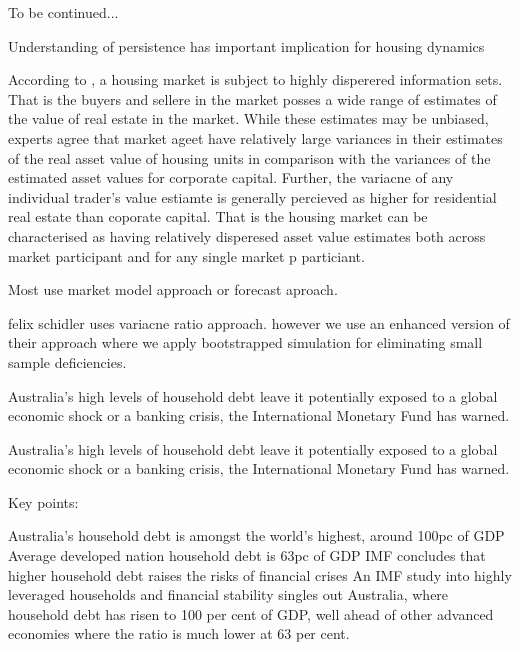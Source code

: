 \documentclass[AEJ,reqno, draftmode]{AEA}
\begin{document}
To be continued...

Understanding of persistence has important implication for housing dynamics


According to \citet{Linneman1986AnMarket}, a housing market is subject to highly disperered information sets. That is the buyers and sellere in the market posses a wide range of estimates of the value of real estate in the market. While these estimates may be unbiased, experts agree that market ageet have relatively large variances in their estimates of the real asset value of housing units in comparison with the variances of the estimated asset values for corporate capital. Further, the variacne of any individual trader's value estiamte is generally percieved as higher for residential real estate than coporate capital. That is the housing market can be characterised as having relatively disperesed asset value estimates both across market participant and for any single market p particiant.


Most use market model approach or forecast aproach. 

felix schidler uses variacne ratio approach. however we use an enhanced version of their approach where we apply bootstrapped simulation for eliminating small sample deficiencies.





Australia's high levels of household debt leave it potentially exposed to a global economic shock or a banking crisis, the International Monetary Fund has warned.


Australia's high levels of household debt leave it potentially exposed to a global economic shock or a banking crisis, the International Monetary Fund has warned.

Key points:

Australia's household debt is amongst the world's highest, around 100pc of GDP
Average developed nation household debt is 63pc of GDP
IMF concludes that higher household debt raises the risks of financial crises
An IMF study into highly leveraged households and financial stability singles out Australia, where household debt has risen to 100 per cent of GDP, well ahead of other advanced economies where the ratio is much lower at 63 per cent.
\end{document}
